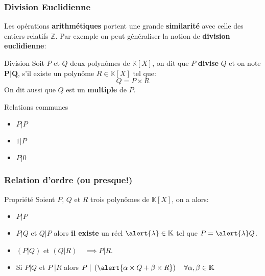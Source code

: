\documentclass{beamer}
\newcommand{\setK}{\mathbb{K}}
\begin{document}
\begin{frame}[t]
  \frametitle{Division Euclidienne}
  \small
  Les opérations \textbf{arithmétiques} portent une grande
  \alert{\textbf{similarité}} avec celle des entiers relatifs $\mathbb{Z}$. Par
  exemple on peut généraliser la notion de \textbf{\alert{division
  euclidienne}}:


  \begin{block}{Division}
    Soit $P$ et $Q$ deux polynômes de $\setK[X]$, on dit que $P$
    \textbf{\alert{divise}}   $Q$ et on note $\mathbf{P\vert Q}$, s'il existe un polynôme $R\in \setK[X]$ tel
    que:
    \begin{equation}
      Q = P\times R
    \end{equation}
    On dit aussi que $Q$ est un \textbf{multiple}  de $P$.
  \end{block}
\pause
  \begin{block}{Relations communes}
    \begin{itemize}
      \item $ P \vert P$\\[4pt]
      \item $ 1 \vert P$\\[4pt]
    \item $ P \vert 0$\\[4pt]
    \end{itemize}   
  \end{block}
  
\end{frame}
\begin{frame}[t]
  \frametitle{Relation d'ordre (ou presque!)}
  
\small
  \begin{block}{Propriété}
    Soient $P$, $Q$ et $R$ trois polynômes de $\setK[X]$, on a alors:

    \begin{itemize}
      \item $ P \vert P$\\[8pt]
      \item $ P \vert Q$ et $Q\vert P$ alors \alert{\textbf{il existe}} un réel
        $\alert{\lambda} \in \setK$ tel que $ P = \alert{\lambda} Q$.\\[8pt]
      \item $\left(P\vert Q\right)$ et $\left(Q \vert R\right)\quad \implies P \vert R$.\\[8pt]
      \item Si $P | Q$ et $P\;\vert R$ alors $P\;|\; \left(\alert{\alpha\times Q
            + \beta\times 
        R}\right)\quad
        \forall \alpha, \beta \in \setK$\\[8pt]
    \end{itemize}
  \end{block}
\end{frame}
\end{document}
